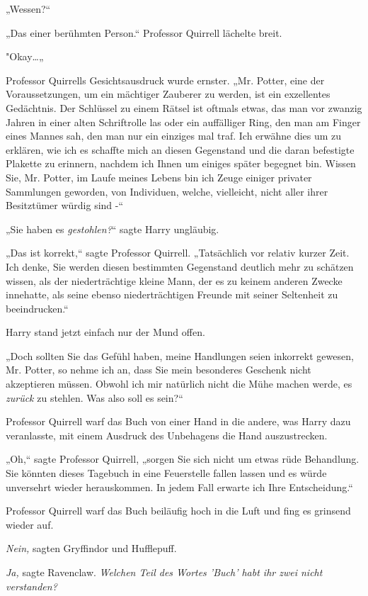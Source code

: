 {„Wessen?“

„Das einer berühmten Person.“ Professor Quirrell lächelte breit.

"Okay…„

Professor Quirrells Gesichtsausdruck wurde ernster. „Mr. Potter, eine der Voraussetzungen, um ein mächtiger Zauberer zu werden, ist ein exzellentes Gedächtnis. Der Schlüssel zu einem Rätsel ist oftmals etwas, das man vor zwanzig Jahren in einer alten Schriftrolle las oder ein auffälliger Ring, den man am Finger eines Mannes sah, den man nur ein einziges mal traf. Ich erwähne dies um zu erklären, wie ich es schaffte mich an diesen Gegenstand und die daran befestigte Plakette zu erinnern, nachdem ich Ihnen um einiges später begegnet bin. Wissen Sie, Mr. Potter, im Laufe meines Lebens bin ich Zeuge einiger privater Sammlungen geworden, von Individuen, welche, vielleicht, nicht aller ihrer Besitztümer würdig sind -“

„Sie haben es \emph{gestohlen?}“ sagte Harry ungläubig.

„Das ist korrekt,“ sagte Professor Quirrell. „Tatsächlich vor relativ kurzer Zeit. Ich denke, Sie werden diesen bestimmten Gegenstand deutlich mehr zu schätzen wissen, als der niederträchtige kleine Mann, der es zu keinem anderen Zwecke innehatte, als seine ebenso niederträchtigen Freunde mit seiner Seltenheit zu beeindrucken.“

Harry stand jetzt einfach nur der Mund offen.

„Doch sollten Sie das Gefühl haben, meine Handlungen seien inkorrekt gewesen, Mr. Potter, so nehme ich an, dass Sie mein besonderes Geschenk nicht akzeptieren müssen. Obwohl ich mir natürlich nicht die Mühe machen werde, es \emph{zurück} zu stehlen. Was also soll es sein?“

Professor Quirrell warf das Buch von einer Hand in die andere, was Harry dazu veranlasste, mit einem Ausdruck des Unbehagens die Hand auszustrecken.

„Oh,“ sagte Professor Quirrell, „sorgen Sie sich nicht um etwas rüde Behandlung. Sie könnten dieses Tagebuch in eine Feuerstelle fallen lassen und es würde unversehrt wieder herauskommen. In jedem Fall erwarte ich Ihre Entscheidung.“

Professor Quirrell warf das Buch beiläufig hoch in die Luft und fing es grinsend wieder auf.

\emph{Nein,} sagten Gryffindor und Hufflepuff.

\emph{Ja,} sagte Ravenclaw. \emph{Welchen Teil des Wortes 'Buch' habt ihr zwei nicht} \emph{verstanden?}

}
